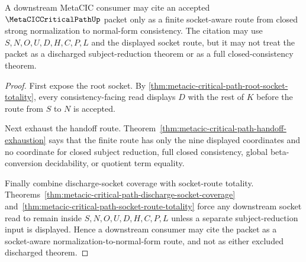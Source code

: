 \begin{theorem}
\label{thm:metacic-critical-path-downstream-unblock-readiness}
A downstream MetaCIC consumer may cite an accepted $\MetaCICCriticalPathUp$ packet only as a finite socket-aware route from closed strong normalization to normal-form consistency. The citation may use $S,N,O,U,D,H,C,P,L$ and the displayed socket route, but it may not treat the packet as a discharged subject-reduction theorem or as a full closed-consistency theorem.
\end{theorem}
\begin{proof}
First expose the root socket. By \autoref{thm:metacic-critical-path-root-socket-totality}, every consistency-facing read displays $D$ with the rest of $K$ before the route from $S$ to $N$ is accepted.

Next exhaust the handoff route. Theorem~\ref{thm:metacic-critical-path-handoff-exhaustion} says that the finite route has only the nine displayed coordinates and no coordinate for closed subject reduction, full closed consistency, global beta-conversion decidability, or quotient term equality.

Finally combine discharge-socket coverage with socket-route totality. Theorems~\ref{thm:metacic-critical-path-discharge-socket-coverage} and~\ref{thm:metacic-critical-path-socket-route-totality} force any downstream socket read to remain inside $S,N,O,U,D,H,C,P,L$ unless a separate subject-reduction input is displayed. Hence a downstream consumer may cite the packet as a socket-aware normalization-to-normal-form route, and not as either excluded discharged theorem.
\end{proof}
